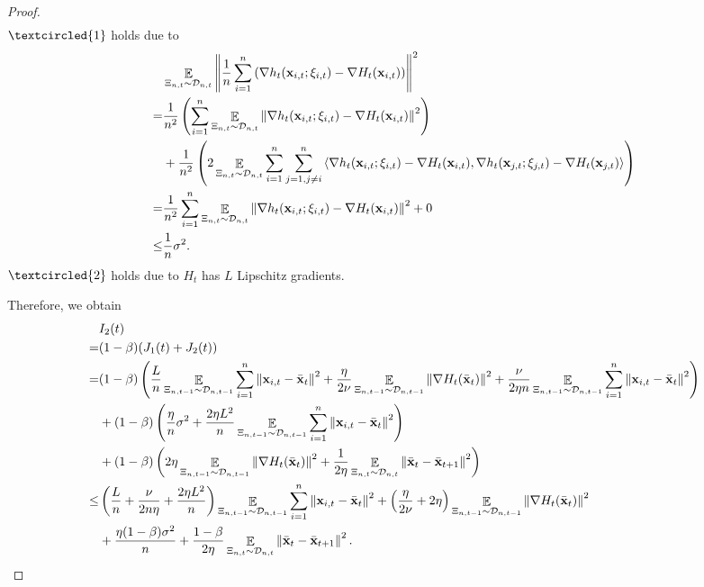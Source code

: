 \documentclass{article}
\begin{document}
\begin{proof}
\begin{align}
\end{align} $\textcircled{1}$ holds due to
\begin{align}
\nonumber
& \mathop{\mathbb{E}}_{ \Xi_{n,t} \sim \mathcal{D}_{n,t} }\left\lVert\frac{1}{n}\sum_{i=1}^n \left(  \nabla h_t({\bf x}_{i,t};\xi_{i,t}) - \nabla H_t({\bf x}_{i,t})  \right) \right\rVert^2 \\ \nonumber 
= & \frac{1}{n^2}\left(  \sum_{i=1}^n \mathop{\mathbb{E}}_{ \Xi_{n,t} \sim \mathcal{D}_{n,t} }\left\lVert \nabla h_t({\bf x}_{i,t};\xi_{i,t}) - \nabla H_t({\bf x}_{i,t}) \right\rVert^2   \right) \\ \nonumber 
& + \frac{1}{n^2}\left( 2\mathop{\mathbb{E}}_{ \Xi_{n,t} \sim \mathcal{D}_{n,t} }\sum_{i=1}^n\sum_{j=1, j\neq i}^n\left\langle \nabla h_t({\bf x}_{i,t};\xi_{i,t}) - \nabla H_t({\bf x}_{i,t}),  \nabla h_t({\bf x}_{j,t};\xi_{j,t}) - \nabla H_t({\bf x}_{j,t}) \right\rangle  \right) \\ \nonumber
= & \frac{1}{n^2}\sum_{i=1}^n \mathop{\mathbb{E}}_{ \Xi_{n,t} \sim \mathcal{D}_{n,t} }\left\lVert \nabla h_t({\bf x}_{i,t};\xi_{i,t}) - \nabla H_t({\bf x}_{i,t}) \right\rVert^2 + 0 \\ \nonumber
\le & \frac{1}{n} \sigma^2.
\end{align} $\textcircled{2}$ holds due to $H_t$ has $L$ Lipschitz gradients.

 Therefore, we obtain
\begin{align}
\nonumber
& I_2(t) \\ \nonumber 
= & (1-\beta)(J_1(t) + J_2(t)) \\ \nonumber
= &  (1-\beta)\left(  \frac{L}{n}\mathop{\mathbb{E}}_{ \Xi_{n,t-1} \sim \mathcal{D}_{n,t-1} }\sum_{i=1}^n \left\lVert{\bf x}_{i,t} - \bar{{\bf x}}_t\right\rVert^2 + \frac{\eta}{2\nu}\mathop{\mathbb{E}}_{ \Xi_{n,t-1} \sim \mathcal{D}_{n,t-1} }\left\lVert\nabla H_t(\bar{{\bf x}}_t)\right\rVert^2 + \frac{\nu}{2\eta n}\mathop{\mathbb{E}}_{ \Xi_{n,t-1} \sim \mathcal{D}_{n,t-1} }\sum_{i=1}^n\left\lVert{\bf x}_{i,t} - \bar{{\bf x}}_t \right\rVert^2  \right) \\ \nonumber
& + (1-\beta)\left(  \frac{\eta}{n} \sigma^2 + \frac{2\eta L^2}{n}\mathop{\mathbb{E}}_{ \Xi_{n,t-1} \sim \mathcal{D}_{n,t-1} }\sum_{i=1}^n \left\lVert{\bf x}_{i,t} - \bar{{\bf x}}_t \right\rVert^2  \right) \\ \nonumber 
& + (1-\beta)\left(  2\eta \mathop{\mathbb{E}}_{ \Xi_{n,t-1} \sim \mathcal{D}_{n,t-1} }\left\lVert\nabla H_t(\bar{{\bf x}}_t)\right\rVert^2 + \frac{1}{2\eta} \mathop{\mathbb{E}}_{ \Xi_{n,t} \sim \mathcal{D}_{n,t} }\left\lVert \bar{{\bf x}}_t - \bar{{\bf x}}_{t+1}\right\rVert^2  \right) \\ \nonumber
\le &  \left(  \frac{L}{n} + \frac{\nu}{2n\eta} + \frac{2\eta L^2}{n}  \right)\mathop{\mathbb{E}}_{ \Xi_{n,t-1} \sim \mathcal{D}_{n,t-1} }\sum_{i=1}^n\left\lVert{\bf x}_{i,t} - \bar{{\bf x}}_t \right\rVert^2   + \left(  \frac{\eta}{2\nu} + 2\eta  \right)\mathop{\mathbb{E}}_{ \Xi_{n,t-1} \sim \mathcal{D}_{n,t-1} }\left\lVert\nabla H_t(\bar{{\bf x}}_t)\right\rVert^2 \\ \nonumber 
&+ \frac{\eta (1-\beta)\sigma^2}{n} +  \frac{1-\beta}{2\eta} \mathop{\mathbb{E}}_{ \Xi_{n,t} \sim \mathcal{D}_{n,t} }\left\lVert \bar{{\bf x}}_t - \bar{{\bf x}}_{t+1}\right\rVert^2.
\end{align}


\end{proof}
\end{document}
